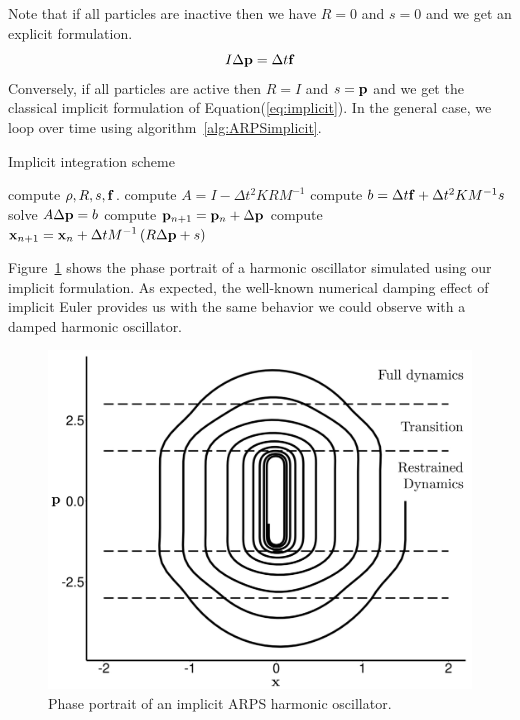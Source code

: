 Note that if all particles are inactive then we have $R = 0$ and $s = 0$ and we get an explicit formulation.
\begin{equation}
    \label{eq:ARPSImplicitRestrained}
    I \Delta \mathbf{p} = \Delta t \mathbf{f}
\end{equation}
Conversely, if all particles are active then $R = I$ and $s = \mathbf{p}$ and we get the classical implicit formulation of Equation(\ref{eq:implicit}).
In the general case, we loop over time using algorithm~\ref{alg:ARPSimplicit}.
\begin{algorithm}[H]
    \caption[ARPS: Implicit integration scheme]{Implicit integration scheme}
    \label{alg:ARPSimplicit}
    \begin{algorithmic}[10]
	    \State compute $\rho, R, s, \mathbf{f}$.
	    \State compute $A = I - \Delta t^{2}KRM^{-1}$
	    \State compute $b = \Delta t \mathbf{f} + \Delta t^{2}KM^{-1}s$
	    \State solve $A \Delta \mathbf{p} = b$
            \State compute $\mathbf{p}_{n+1} = \mathbf{p}_{n} + \Delta \mathbf{p}$
	    \State compute $\displaystyle \mathbf{x}_{n+1} = \mathbf{x}_{n} +
            \Delta t M^{-1}\left( R\Delta \mathbf{p}+ s \right)$
	\EndFor
    \end{algorithmic}
\end{algorithm}

Figure~\ref{fig:implicitHOPP} shows the phase portrait of a harmonic oscillator simulated using our implicit formulation.
As expected, the well-known numerical damping effect of implicit Euler provides us with the same behavior we could observe with a damped harmonic oscillator.

\begin{figure}[!h]
	\centering
	\includegraphics[width=0.8\linewidth]{images/arps-vriphys2013/implicitHOPPraw_hacked.png}
	\caption[ARPS: Phase portrait of an implicit ARPS harmonic oscillator]{\label{fig:implicitHOPP} Phase portrait of an implicit ARPS harmonic oscillator.}
\end{figure}

